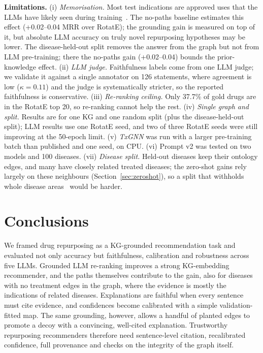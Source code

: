 \documentclass[electronics,article,submit]{Definitions/mdpi}
\begin{document}
\textbf{Limitations.} (i) \emph{Memorisation.} Most test indications are approved uses that the LLMs have likely seen during training~\cite{carlini2021extracting}. The no-paths baseline estimates this effect (+0.02--0.04 MRR over RotatE); the grounding gain is measured on top of it, but absolute LLM accuracy on truly novel repurposing hypotheses may be lower. The disease-held-out split removes the answer from the graph but not from LLM pre-training; there the no-paths gain (+0.02--0.04) bounds the prior-knowledge effect. (ii) \emph{LLM judge.} Faithfulness labels come from one LLM judge; we validate it against a single annotator on 126 statements, where agreement is low ($\kappa = 0.11$) and the judge is systematically stricter, so the reported faithfulness is conservative. (iii) \emph{Re-ranking ceiling.} Only 37.7\% of gold drugs are in the RotatE top 20, so re-ranking cannot help the rest. (iv) \emph{Single graph and split.} Results are for one KG and one random split (plus the disease-held-out split); LLM results use one RotatE seed, and two of three RotatE seeds were still improving at the 50-epoch limit. (v) \emph{TxGNN} was run with a larger pre-training batch than published and one seed, on CPU. (vi) Prompt v2 was tested on two models and 100 diseases. (vii) \emph{Disease split.} Held-out diseases keep their ontology edges, and many have closely related treated diseases; the zero-shot gains rely largely on these neighbours (Section~\ref{sec:zeroshot}), so a split that withholds whole disease areas~\cite{huang2024txgnn} would be harder.

\section{Conclusions}
We framed drug repurposing as a KG-grounded recommendation task and evaluated not only accuracy but faithfulness, calibration and robustness across five LLMs. Grounded LLM re-ranking improves a strong KG-embedding recommender, and the paths themselves contribute to the gain, also for diseases with no treatment edges in the graph, where the evidence is mostly the indications of related diseases. Explanations are faithful when every sentence must cite evidence, and confidences become calibrated with a simple validation-fitted map. The same grounding, however, allows a handful of planted edges to promote a decoy with a convincing, well-cited explanation. Trustworthy repurposing recommenders therefore need sentence-level citation, recalibrated confidence, full provenance and checks on the integrity of the graph itself.
\end{document}
